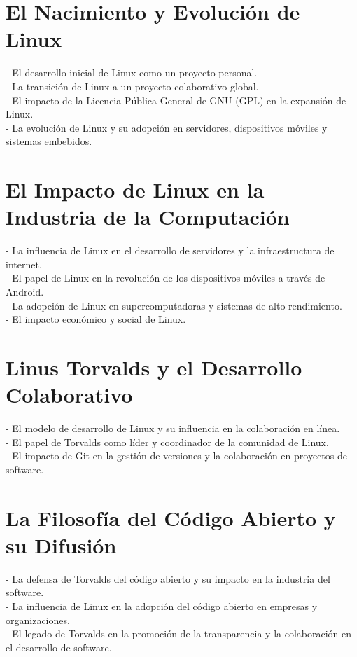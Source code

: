 \documentclass[a4paper,12pt]{article}
\begin{document}
\section{El Nacimiento y Evolución de Linux} 
- El desarrollo inicial de Linux
como un proyecto personal.\\ 
- La transición de Linux a un proyecto colaborativo
global.\\ 
- El impacto de la Licencia Pública General de GNU (GPL) en la
expansión de Linux.\\ 
- La evolución de Linux y su adopción en servidores,
dispositivos móviles y sistemas embebidos.

\section{El Impacto de Linux en la Industria de la Computación} 
- La influencia
de Linux en el desarrollo de servidores y la infraestructura de internet.\\ 
- El
papel de Linux en la revolución de los dispositivos móviles a través de
Android.\\ 
- La adopción de Linux en supercomputadoras y sistemas de alto
rendimiento.\\ 
- El impacto económico y social de Linux.

\section{Linus Torvalds y el Desarrollo Colaborativo} 
- El modelo de desarrollo
de Linux y su influencia en la colaboración en línea.\\ 
- El papel de Torvalds
como líder y coordinador de la comunidad de Linux.\\ 
- El impacto de Git en la
gestión de versiones y la colaboración en proyectos de software.

\section{La Filosofía del Código Abierto y su Difusión} 
- La defensa de Torvalds
del código abierto y su impacto en la industria del software.\\ 
- La influencia
de Linux en la adopción del código abierto en empresas y organizaciones.\\ 
- El
legado de Torvalds en la promoción de la transparencia y la colaboración en el
desarrollo de software.
\end{document}
